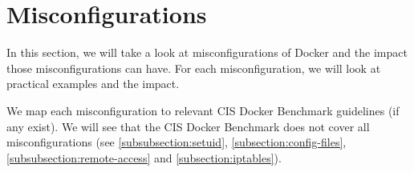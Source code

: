\section{Misconfigurations}\label{section:misconfigurations}
In this section, we will take a look at misconfigurations of Docker and the impact those misconfigurations can have. For each misconfiguration, we will look at practical examples and the impact.

\medskip

We map each misconfiguration to relevant CIS Docker Benchmark guidelines (if any exist). We will see that the CIS Docker Benchmark does not cover all misconfigurations (see \autoref{subsubsection:setuid}, \autoref{subsection:config-files}, \autoref{subsubsection:remote-access} and \autoref{subsection:iptables}).








